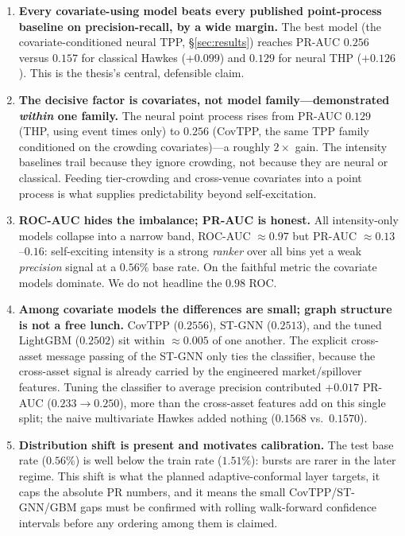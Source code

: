 \documentclass[11pt,a4paper]{article}
\begin{document}
\begin{enumerate}
    \item \textbf{Every covariate-using model beats every published point-process baseline on precision-recall, by a wide margin.} The best model (the covariate-conditioned neural TPP, \S\ref{sec:results}) reaches PR-AUC $0.256$ versus $0.157$ for classical Hawkes ($+0.099$) and $0.129$ for neural THP ($+0.126$). This is the thesis's central, defensible claim.
    \item \textbf{The decisive factor is covariates, not model family---demonstrated \emph{within} one family.} The neural point process rises from PR-AUC $0.129$ (THP, using event times only) to $0.256$ (CovTPP, the same TPP family conditioned on the crowding covariates)---a roughly $2\times$ gain. The intensity baselines trail because they ignore crowding, not because they are neural or classical. Feeding tier-crowding and cross-venue covariates into a point process is what supplies predictability beyond self-excitation.
    \item \textbf{ROC-AUC hides the imbalance; PR-AUC is honest.} All intensity-only models collapse into a narrow band, ROC-AUC $\approx 0.97$ but PR-AUC $\approx 0.13$--$0.16$: self-exciting intensity is a strong \emph{ranker} over all bins yet a weak \emph{precision} signal at a $0.56\%$ base rate. On the faithful metric the covariate models dominate. We do not headline the $0.98$ ROC.
    \item \textbf{Among covariate models the differences are small; graph structure is not a free lunch.} CovTPP ($0.2556$), ST-GNN ($0.2513$), and the tuned LightGBM ($0.2502$) sit within $\approx 0.005$ of one another. The explicit cross-asset message passing of the ST-GNN only ties the classifier, because the cross-asset signal is already carried by the engineered market/spillover features. Tuning the classifier to average precision contributed $+0.017$ PR-AUC ($0.233\to0.250$), more than the cross-asset features add on this single split; the naive multivariate Hawkes added nothing ($0.1568$ vs.\ $0.1570$).
    \item \textbf{Distribution shift is present and motivates calibration.} The test base rate ($0.56\%$) is well below the train rate ($1.51\%$): bursts are rarer in the later regime. This shift is what the planned adaptive-conformal layer targets, it caps the absolute PR numbers, and it means the small CovTPP/ST-GNN/GBM gaps must be confirmed with rolling walk-forward confidence intervals before any ordering among them is claimed.
\end{enumerate}
\end{document}
